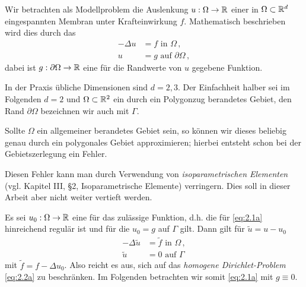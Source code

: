 Wir betrachten als Modellproblem die Auslenkung $u: \Omega \rightarrow \mathbb{R}$ einer in $\Omega \subset \mathbb{R}^d$ eingespannten Membran unter Krafteinwirkung $f$. Mathematisch beschrieben wird dies durch das  \textit{}
\begin{subequations}\label{eq:2.1a}
\begin{align}\label{eq:2.1aa}
	-\Delta u &= f \text{ in } \Omega \, ,\\
	\label{eq:2.1ab}
	u & = g \text{ auf } \partial \Omega \, ,
\end{align}
\end{subequations}
dabei ist $g: \partial \Omega \rightarrow \mathbb{R}$ eine für die Randwerte von $u$ gegebene Funktion.


\begin{notation} 
In der Praxis übliche Dimensionen sind $d = 2,3$. Der Einfachheit halber sei im Folgenden $d = 2$ und $\Omega \subset \mathbb{R}^2$ ein durch ein Polygonzug berandetes Gebiet, den Rand $\partial \Omega$ bezeichnen wir auch mit $\Gamma$.
\end{notation}


\begin{bem*}
Sollte $\Omega$ ein allgemeiner berandetes Gebiet sein, so können wir dieses beliebig genau durch ein polygonales Gebiet approximieren; hierbei entsteht schon bei der Gebietszerlegung ein Fehler.

Diesen Fehler kann man durch Verwendung von \textit{isoparametrischen Elementen} (vgl. \cite{BraeFEM} Kapitel III, \S2, Isoparametrische Elemente) verringern. Dies soll in dieser Arbeit aber nicht weiter vertieft werden.
\end{bem*}


Es sei $u_0: \Omega \rightarrow \mathbb{R}$ eine für das  zulässige Funktion, d.h. die für   \eqref{eq:2.1a} hinreichend regulär ist und für die $u_0 = g$ auf $\Gamma$ gilt. Dann gilt für 
$\tilde u = u-u_0$
\begin{subequations}\label{eq:2.2a}
\begin{align}\label{eq:2.2aa}
	-\Delta \tilde u &= \tilde f \text{ in } \Omega \, ,\\
	\label{eq:2.2ab}
	\tilde u & = 0 \text{ auf } \Gamma 
\end{align}
\end{subequations}
mit $\tilde f = f-\Delta u_0$. Also reicht es aus, sich auf das \textit{homogene Dirichlet-Problem} \eqref{eq:2.2a} zu beschränken. Im Folgenden betrachten wir somit \eqref{eq:2.1a} mit $g \equiv 0$.

